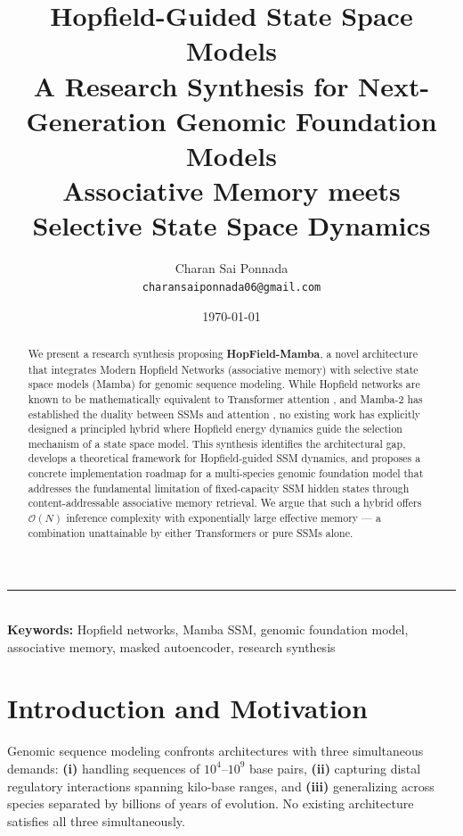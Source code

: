 \documentclass[11pt,a4paper]{article}
\title{
    \vspace{-1.5cm}
    {\Huge\bfseries Hopfield-Guided State Space Models}\\[0.3cm]
    {\Large A Research Synthesis for Next-Generation Genomic Foundation Models}\\[0.2cm]
    {\large Associative Memory meets Selective State Space Dynamics}
}
\author{
    Charan Sai Ponnada\\
    \texttt{charansaiponnada06@gmail.com}\\
}
\date{\today}
\numberwithin{equation}{section}
\begin{document}
\maketitle
\thispagestyle{empty}

\begin{abstract}
We present a research synthesis proposing \textbf{HopField-Mamba}, a novel architecture that
integrates Modern Hopfield Networks (associative memory) with selective state space models
(Mamba) for genomic sequence modeling. While Hopfield networks are known to be mathematically
equivalent to Transformer attention \cite{ramsauer2021hopfield}, and Mamba-2 has established
the duality between SSMs and attention \cite{dao2024transformers}, no existing work has
explicitly designed a principled hybrid where Hopfield energy dynamics guide the selection
mechanism of a state space model. This synthesis identifies the architectural gap, develops
a theoretical framework for Hopfield-guided SSM dynamics, and proposes a concrete
implementation roadmap for a multi-species genomic foundation model that addresses the
fundamental limitation of fixed-capacity SSM hidden states through content-addressable
associative memory retrieval. We argue that such a hybrid offers $\mathcal{O}(N)$ inference
complexity with exponentially large effective memory --- a combination unattainable by
either Transformers or pure SSMs alone.
\end{abstract}

\vfill
\begin{center}
\rule{0.6\textwidth}{0.5pt}\\[0.3cm]
{\small\textbf{Keywords:} Hopfield networks, Mamba SSM, genomic foundation model,
associative memory, masked autoencoder, research synthesis}
\end{center}
\newpage

\section{Introduction and Motivation}
\label{sec:intro}

Genomic sequence modeling confronts architectures with three simultaneous demands:
\textbf{(i)} handling sequences of $10^4$--$10^9$ base pairs, \textbf{(ii)} capturing
distal regulatory interactions spanning kilo-base ranges, and \textbf{(iii)} generalizing
across species separated by billions of years of evolution. No existing architecture
satisfies all three simultaneously.
\end{document}
